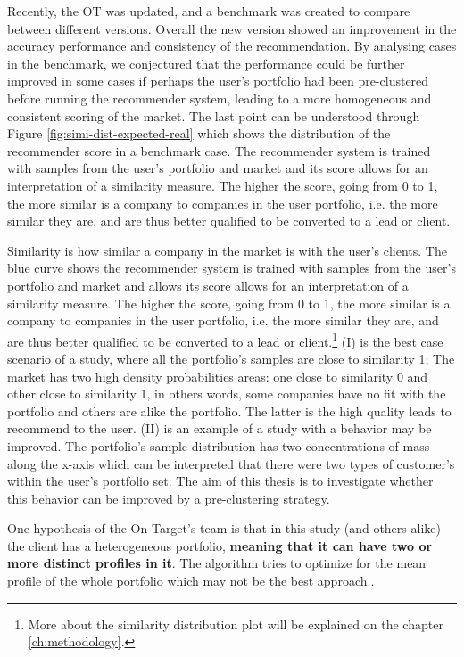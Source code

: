 Recently, the OT was updated, and a benchmark was created to compare between different versions. Overall the new version showed an improvement in the accuracy performance and consistency of the recommendation. By analysing cases in the benchmark, we conjectured that the performance could be further improved in some cases if perhaps the user's portfolio had been pre-clustered before running the recommender system, leading to a more homogeneous and consistent scoring of the market. The last point can be understood through Figure \ref{fig:simi-dist-expected-real} which shows the distribution of the recommender score in a benchmark case. The recommender system is trained with samples from the user's portfolio and market and its score allows for an interpretation of a similarity measure. The higher the score, going from 0 to 1, the more similar is a company to companies in the user portfolio, i.e. the more similar they are, and are thus better qualified to be converted to a lead or client.

Similarity is how similar a company in the market is with the user's clients. The blue curve shows the recommender system is trained with samples from the user's portfolio and market and allows its score allows for an interpretation of a similarity measure. The higher the score, going from 0 to 1, the more similar is a company to companies in the user portfolio, i.e. the more similar they are, and are thus better qualified to be converted to a lead or client.\footnote{More about the similarity distribution plot will be explained on the chapter \ref{ch:methodology}.}
(I) is the best case scenario of a study, where all the portfolio's samples are close to similarity 1; The market has two high density probabilities areas: one close to similarity 0 and other close to similarity 1, in others words, some companies have no fit with the portfolio and others are alike the portfolio. The latter is the high quality leads to recommend to the user. (II) is an example of a study with a behavior may be improved. The portfolio's sample distribution has two concentrations of mass along the x-axis which can be interpreted that there were two types of customer's within the user's portfolio set. The aim of this thesis is to investigate whether this behavior can be improved by a pre-clustering strategy.

One hypothesis of the On Target's team is that in this study (and others alike) the client has a heterogeneous portfolio, \textbf{meaning that it can have two or more distinct profiles in it}. The algorithm tries to optimize for the mean profile of the whole portfolio which may not be the best approach..

